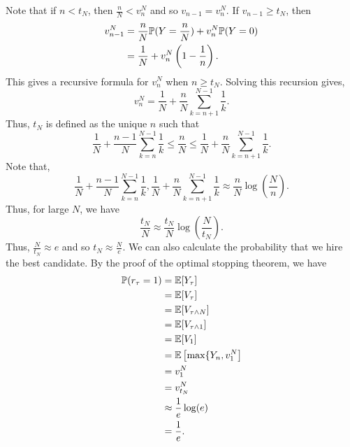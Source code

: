  Note that if $n < t_N$, then $\frac{n}{N} < v_n^N$ and so $v_{n-1} = v_n^N$. If $v_{n-1} \ge t_N$, then 
 \begin{align*}
     v_{n-1}^N &= \frac{n}{N}{\mathbb{P}}(Y= \frac{n}{N})+v_n^N{\mathbb{P}}(Y=0)\\
     &= \frac{1}{N}+v_n^N\left(1-\frac{1}{n}\right).
 \end{align*}
 This gives a recursive formula for $v_n^N$ when $n \ge t_N$. Solving this recursion gives,
 \[v_n^N = \frac{1}{N}+\frac{n}{N}\sum_{k=n+1}^{N-1}\frac{1}{k}. \]
 Thus, $t_N$ is defined as the unique $n$ such that 
 \[\frac{1}{N}+\frac{n-1}{N}\sum_{k=n}^{N-1}\frac{1}{k} \le \frac{n}{N} \le \frac{1}{N}+\frac{n}{N}\sum_{k=n+1}^{N-1}\frac{1}{k}. \]
 Note that,
 \[\frac{1}{N}+\frac{n-1}{N}\sum_{k=n}^{N-1}\frac{1}{k},\frac{1}{N}+\frac{n}{N}\sum_{k=n+1}^{N-1}\frac{1}{k} \approx \frac{n}{N}\log\left(\frac{N}{n}\right). \]
 Thus, for large $N$, we have 
 \[\frac{t_N}{N} \approx \frac{t_N}{N}\log\left(\frac{N}{t_N}\right). \]
 Thus, $\frac{N}{t_N} \approx e$ and so $t_N \approx \frac{N}{e}$. We can also calculate the probability that we hire the best candidate. By the proof of the optimal stopping theorem, we have
 \begin{align*}
     {\mathbb{P}}(r_\tau = 1) &= {\mathbb{E}}[Y_\tau]\\
     &={\mathbb{E}}[V_\tau]\\
     &={\mathbb{E}}[V_{\tau \land N}]\\
     &={\mathbb{E}}[V_{\tau \land 1}]\\
     &={\mathbb{E}}[V_1]\\
     &={\mathbb{E}}\left[\max\{Y_n, v_1^N\right]\\
     &=v_1^N\\
     &=v_{t_N}^N\\
     &\approx \frac{1}{e}\log(e)\\
     &=\frac{1}{e}.
 \end{align*}
